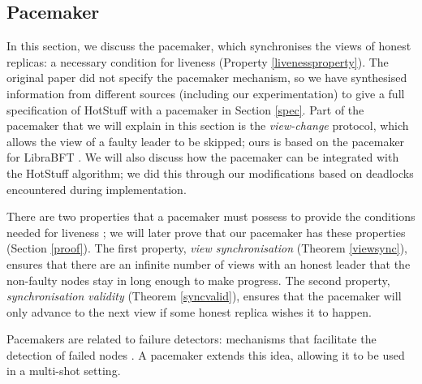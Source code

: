 \subsection{Pacemaker} \label{pacemaker}

In this section, we discuss the pacemaker, which synchronises the views of honest replicas: a necessary condition for liveness (Property \ref{livenessproperty}). The original paper did not specify the pacemaker mechanism, so we have synthesised information from different sources (including our experimentation) to give a full specification of HotStuff with a pacemaker in Section \ref{spec}. Part of the pacemaker that we will explain in this section is the \textit{view-change} protocol, which allows the view of a faulty leader to be skipped; ours is based on the pacemaker for LibraBFT \cite{baudetStateMachineReplication2019, ittai}. We will also discuss how the pacemaker can be integrated with the HotStuff algorithm; we did this through our modifications based on deadlocks encountered during implementation.


There are two properties that a pacemaker must possess to provide the conditions needed for liveness \cite{naorCogsworthByzantineView2021}; we will later prove that our pacemaker has these properties (Section \ref{proof}). The first property, \textit{view synchronisation} (Theorem \ref{viewsync}), ensures that there are an infinite number of views with an honest leader that the non-faulty nodes stay in long enough to make progress. The second property, \textit{synchronisation validity} (Theorem \ref{syncvalid}), ensures that the pacemaker will only advance to the next view if some honest replica wishes it to happen.

Pacemakers are related to failure detectors: mechanisms that facilitate the detection of failed nodes \cite{chandraWeakestFailureDetector1996,chandraUnreliableFailureDetectors1996}. A pacemaker extends this idea, allowing it to be used in a multi-shot setting.


